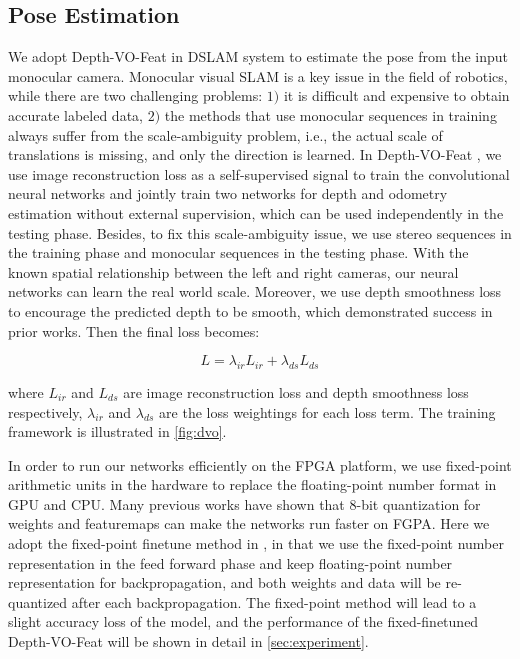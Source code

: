 \subsection{Pose Estimation}
We adopt Depth-VO-Feat \cite{Zhan:2018e92} in DSLAM system to estimate the pose from the input monocular camera. Monocular visual SLAM is a key issue in the field of robotics, while there are two challenging problems: $1)$ it is difficult and expensive to obtain accurate labeled data, $2)$ the methods that use monocular sequences in training always suffer from the scale-ambiguity problem, i.e., the actual scale of translations is missing, and only the direction is learned. In Depth-VO-Feat \cite{Zhan:2018e92}, we use image reconstruction loss as a self-supervised signal to train the convolutional neural networks and jointly train two networks for depth and odometry estimation without external supervision, which can be used independently in the testing phase. Besides, to fix this scale-ambiguity issue, we use stereo sequences in the training phase and monocular sequences in the testing phase. With the known spatial relationship between the left and right cameras, our neural networks can learn the real world scale. Moreover, we use depth smoothness loss to encourage the predicted depth to be smooth, which demonstrated success in prior works. Then the final loss becomes:

\begin{equation}
    L=\lambda_{ir}L_{ir}+\lambda_{ds}L_{ds}
    \label{equ:loss}
\end{equation}

where $L_{ir}$ and $L_{ds}$ are image reconstruction loss and depth smoothness loss respectively, $\lambda_{ir}$ and $\lambda_{ds}$ are the loss weightings for each loss term. The training framework is illustrated in \cref{fig:dvo}.

In order to run our networks efficiently on the FPGA platform, we use fixed-point arithmetic units in the hardware to replace the floating-point number format in GPU and CPU. Many previous works have shown that 8-bit quantization for weights and featuremaps can make the networks run faster on FGPA. Here we adopt the fixed-point finetune method in \cite{Yu:2018:IDC:3299999.3283452}, in that we use the fixed-point number representation in the feed forward phase and keep floating-point number representation for backpropagation, and both weights and data will be re-quantized after each backpropagation. The fixed-point method will lead to a slight accuracy loss of the model, and the performance of the fixed-finetuned Depth-VO-Feat will be shown in detail in \cref{sec:experiment}.


